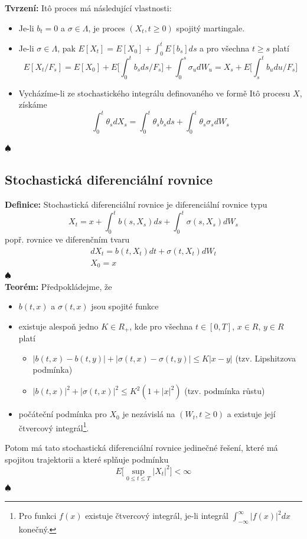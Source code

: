 \documentclass[a4paper]{book}
\begin{document}
\noindent \textbf{Tvrzení:} It\^o proces má následující vlastnosti:
\begin{itemize}
\item Je-li $b_t = 0$ a $\sigma \in \Lambda$, je proces $(X_t, t \ge 0)$ spojitý martingale.
\item Je-li $\sigma \in \Lambda$, pak $E[X_t] = E[X_0] + \int_0^t E[b_s]ds$ a pro všechna $t \ge s$ platí
\begin{equation*}
E[X_t/F_s] = E[X_0] + E\Big[ \int_0^t b_s ds / F_s \Big] + \int_0^s \sigma_u d W_u = X_s + E\Big[ \int_s^t b_u du/F_s\Big]
\end{equation*}
\item Vycházíme-li ze stochastického integrálu definovaného ve formě It\^o procesu $X$, získáme
\begin{equation*}
\int_0^t \theta_s d X_s = \int_0^t \theta_s b_s ds + \int_0^t \theta_s \sigma_s d W_s
\end{equation*} 
\end{itemize}
$\spadesuit$

\subsection{Stochastická diferenciální rovnice}

\noindent \textbf{Definice:} Stochastická diferenciální rovnice je diferenciální rovnice typu
\begin{equation*}
X_t = x + \int_0^t b(s, X_s) ds + \int_0^t \sigma(s,X_s)d W_s
\end{equation*}
popř. rovnice ve diferenčním tvaru
\begin{gather*}
d X_t = b(t, X_t)dt + \sigma(t,X_t)d W_t\\
X_0 = x
\end{gather*}
$\spadesuit$\\

\noindent \textbf{Teorém:} Předpokládejme, že
\begin{itemize}
\item $b(t,x)$ a $\sigma(t,x)$ jsou spojité funkce
\item existuje alespoň jedno $K \in R_{+}$, kde pro všechna $t \in [0,T]$, $x \in R$, $y \in R$ platí
\begin{itemize}
\item $|b(t,x) - b(t, y)| + |\sigma(t,x) - \sigma(t, y)| \le K|x-y|$ (tzv. Lipshitzova podmínka)
\item $|b(t,x)|^2 + |\sigma(t, x)|^2 \le K^2(1 + |x|^2)$ (tzv. podmínka růstu)
\end{itemize}
\item počáteční podmínka pro $X_0$ je nezávislá na $(W_t, t \ge 0)$ a existuje její čtvercový integrál\footnote{Pro funkci $f(x)$ existuje čtvercový integrál, je-li integrál $\int_{-\infty}^{\infty} |f(x)|^2 dx $ konečný.}.  
\end{itemize}
Potom má tato stochastická diferenciální rovnice jedinečné řešení, které má spojitou trajektorii a které splňuje podmínku
\begin{equation*}
E \Big[ \sup_{0 \le t \le T} |X_t|^2 \Big] < \infty
\end{equation*}
$\spadesuit$\\
\end{document}
